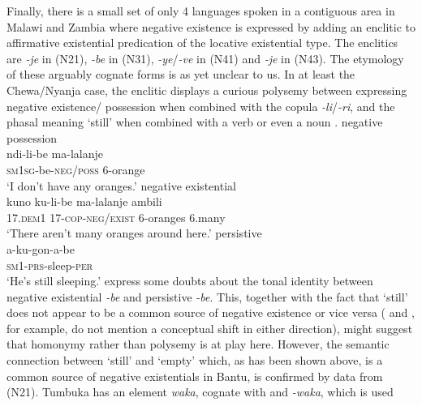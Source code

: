 \documentclass[output=paper]{langsci/langscibook}
\begin{document}
Finally, there is a small set of only 4 languages spoken in a contiguous
area in Malawi and Zambia where negative existence is expressed by adding
an enclitic to affirmative existential predication of the locative
existential type. The enclitics are \textit{-je} in  (N21),
\textit{-be} in  (N31),
\textit{-ye}/\textit{-ve} in  (N41) and \textit{-je} in
 (N43). The etymology of these arguably cognate forms is as
yet unclear to us. In at least the Chewa\slash Nyanja case, the enclitic
displays a curious polysemy between expressing negative existence\slash
possession when combined with the copula \textit{-li}/\textit{-ri}, and the
phasal meaning `still' when combined with a verb or even a noun 
%
\parencites[116]{Hetherwick1916}[97, 99]{Watkins1937}[209]{Price1953}
[116, 205, 279]{StevickHollander1965}[20--21]{Paas2004}
[60, 68]{Mchombo2004}[150, 153, 161]{Kiso2012}.  
%
\ea\label{ex:chewa-nyanja-orange-sleep}  \ea negative possession\\
\gll ndi-li-be ma-lalanje\\ \textsc{sm1sg}-be-\textsc{neg/poss} 6-orange\\
\glt 	`I don't have any oranges.' \ex negative existential\\ \gll kuno
ku-li-be ma-lalanje ambili\\ 17.\textsc{dem1} 17-\textsc{cop-neg/exist}
6-oranges 6.many\\ \glt `There aren't many oranges around here.' \ex
persistive\\ \gll a-ku-gon-a-be\\ \textsc{sm1-prs}-sleep-\textsc{per}\\
\glt `He's still sleeping.' \z\z 
%
\citet[279]{StevickHollander1965} express
some doubts about the tonal identity between negative existential
\textit{-be} and persistive \textit{-be}. This, together with the fact that
`still' does not appear to be a common source of negative existence or vice
versa (\citealt{HeineGuldemann1993} and \citealt{HeineKuteva2002}, for
example, do not mention a conceptual shift in either direction), might
suggest that homonymy rather than polysemy is at play here. However, the
semantic connection between `still' and `empty' which, as has been shown
above, is a common source of negative existentials in Bantu, is confirmed
by data from  (N21). Tumbuka has an element \textit{waka},
cognate with  and  \textit{-waka}, which is used
\end{document}
